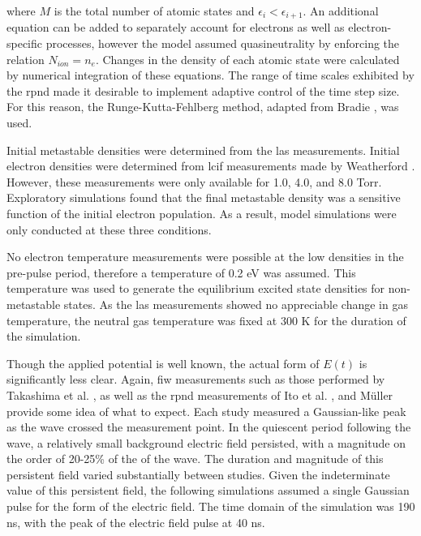 where $M$ is the total number of atomic states and $\epsilon_i <
\epsilon_{i+1}$. An additional equation can be added to separately account for
electrons as well as electron-specific processes, however the model assumed
quasineutrality by enforcing the relation $N_{ion}=n_e$. Changes in the density
of each atomic state were calculated by numerical integration of these
equations. The range of time scales exhibited by the \acs{rpnd} made it
desirable to implement adaptive control of the time step size. For this reason,
the Runge-Kutta-Fehlberg method, adapted from Bradie \cite{Bradie2006}, was
used.

Initial metastable densities were determined from the \acs{las} measurements.
Initial electron densities were determined from \acs{lcif} measurements made by
Weatherford \cite{Weatherford2012a}. However, these measurements were only
available for 1.0, 4.0, and 8.0 Torr. Exploratory simulations found that the
final metastable density was a sensitive function of the initial electron
population. As a result, model simulations were only conducted at these three
conditions.

No electron temperature measurements were possible at the low densities in the
pre-pulse period, therefore a temperature of 0.2 eV was assumed. This
temperature was used to generate the equilibrium excited state densities for
non-metastable states. As the \acs{las} measurements showed no appreciable
change in gas temperature, the neutral gas temperature was fixed at 300 K for
the duration of the simulation.  

Though the applied potential is well known, the actual form of $E(t)$ is
significantly less clear. Again, \acs{fiw} measurements such as those performed
by Takashima et al. \cite{Takashima2011}, as well as the \acs{rpnd} measurements
of Ito et al. \cite{Ito2010}, and M\"{u}ller \cite{Muller2011a} provide some
idea of what to expect. Each study measured a Gaussian-like peak as the wave
crossed the measurement point. In the quiescent period following the wave, a
relatively small background electric field persisted, with a magnitude on the
order of 20-25\% of the of the wave. The duration and magnitude of this
persistent field varied substantially between studies. Given the indeterminate
value of this persistent field, the following simulations assumed a single
Gaussian pulse for the form of the electric field. The time domain of the
simulation was 190 ns, with the peak of the electric field pulse at 40 ns.



